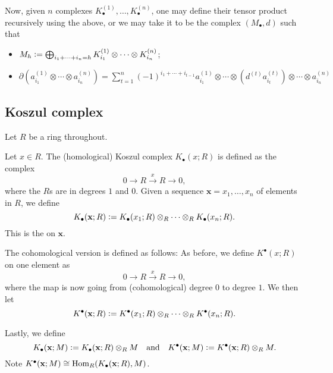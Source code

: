 \documentclass[12pt]{article}
\begin{document}
Now, given $n$ complexes $K^{(1)}_{\bullet}, \ldots, K^{(n)}_{\bullet}$, one may define their tensor product recursively using the above, or we may take it to be the complex $(M_{\bullet}, d)$ such that
\begin{itemize}
	\item $M_{h} \vcentcolon= \bigoplus_{i_{1} + \cdots + i_{n} = h} K^{(1)}_{i_{1}} \otimes \cdots \otimes K^{(n)}_{i_{n}}$;
	\item $\partial(a^{(1)}_{i_{1}} \otimes \cdots \otimes a^{(n)}_{i_{n}}) = \sum_{t = 1}^{n} (-1)^{i_{1} + \cdots + i_{t - 1}} a^{(1)}_{i_{1}} \otimes \cdots \otimes (d^{(t)} a^{(t)}_{i_{t}}) \otimes \cdots \otimes a^{(n)}_{i_{n}}$
\end{itemize}

\subsection{Koszul complex}

Let $R$ be a ring throughout.

Let $x \in R$. The (homological) Koszul complex $K_{\bullet}(x; R)$ is defined as the complex 
\begin{equation*} 
	0 \to R \xrightarrow{x} R \to 0,
\end{equation*}
where the $R$s are in degrees $1$ and $0$. Given a sequence $\mathbf{x} = x_{1}, \ldots, x_{n}$ of elements in $R$, we define
\begin{equation*} 
	K_{\bullet}(\mathbf{x}; R) \vcentcolon= K_{\bullet}(x_{1}; R) \otimes_{R} \cdots \otimes_{R} K_{\bullet}(x_{n}; R).
\end{equation*}
This is the  on $\mathbf{x}$.

The cohomological version is defined as follows: As before, we define $K^{\bullet}(x; R)$ on one element as
\begin{equation*} 
	0 \to R \xrightarrow{x} R \to 0,
\end{equation*}
where the map is now going from (cohomological) degree $0$ to degree $1$. We then let
\begin{equation*} 
	K^{\bullet}(\mathbf{x}; R) \vcentcolon= K^{\bullet}(x_{1}; R) \otimes_{R} \cdots \otimes_{R} K^{\bullet}(x_{n}; R).
\end{equation*}

Lastly, we define
\begin{equation*} 
	K_{\bullet}(\mathbf{x}; M) \vcentcolon= K_{\bullet}(\mathbf{x}; R) \otimes_{R} M \quad\text{and}\quad K^{\bullet}(\mathbf{x}; M) \vcentcolon= K^{\bullet}(\mathbf{x}; R) \otimes_{R} M.
\end{equation*}
Note $K^{\bullet}(\mathbf{x}; M) \cong \operatorname{Hom}_{R}(K_{\bullet}(\mathbf{x}; R), M)$. 
\end{document}
